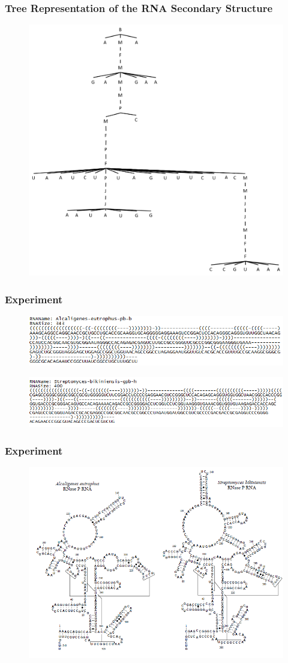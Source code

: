 \documentclass{beamer}
\begin{document}
\begin{frame}
\frametitle{Tree Representation of the RNA Secondary Structure}
\begin{figure}
	\includegraphics[width=0.6\linewidth]{RNAST3}
	\centering
\end{figure}
\end{frame}
\begin{frame}
\frametitle{Experiment}
\begin{figure}
	\includegraphics[width=1.0\linewidth]{AlcaligenesString}
	\centering
\end{figure}
\begin{figure}
	\includegraphics[width=1.0\linewidth]{StreptomycesString}
	\centering
\end{figure}
\end{frame}
\begin{frame}
\frametitle{Experiment}
\begin{figure}
	\includegraphics[width=0.8\linewidth]{RNAGraphExample}
	\centering
\end{figure}
\end{frame}
\end{document}
